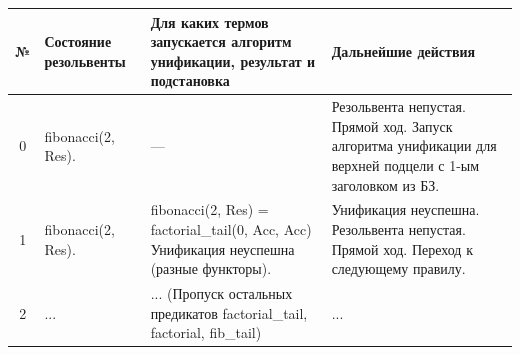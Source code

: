 \begin{tabularx}{\textwidth}{|c|>{\small}X|>{\small}X|>{\small}X|}
	\hline
	\textbf{№}                                                                         &
	\textbf{Состояние резольвенты}                                                     &
	\textbf{Для каких термов запускается алгоритм унификации, результат и подстановка} &
	\textbf{Дальнейшие действия}                                                         \\
	\hline

	0                                                                                  &
	fibonacci(2, Res).                                                                 &
	—                                                                                  &
	Резольвента непустая. \newline
	Прямой ход. \newline
	Запуск алгоритма унификации для верхней подцели с 1-ым заголовком из БЗ.             \\
	\hline

	1                                                                                  &
	fibonacci(2, Res).                                                                 &
	fibonacci(2, Res) = \newline
	factorial\_tail(0, Acc, Acc) \newline
	Унификация неуспешна (разные функторы).                                            &
	Унификация неуспешна. \newline
	Резольвента непустая. \newline
	Прямой ход. Переход к следующему правилу.                                            \\
	\hline

	2                                                                                  &
	...                                                                                &
	... (Пропуск остальных предикатов factorial\_tail, factorial, fib\_tail)           &
	...                                                                                  \\
	\hline


\end{tabularx}
